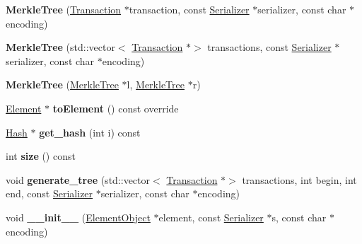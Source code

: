 \begin{DoxyCompactItemize}
\item 
\mbox{\label{classMerkleTree_a257abaf20fa542b29dfdab95294ae578}} 
{\bfseries Merkle\+Tree} (\mbox{\hyperlink{classTransaction}{Transaction}} $\ast$transaction, const \mbox{\hyperlink{classSerializer}{Serializer}} $\ast$serializer, const char $\ast$encoding)
\item 
\mbox{\label{classMerkleTree_abc65d820b1b59f00350b2f4a4bc580bd}} 
{\bfseries Merkle\+Tree} (std\+::vector$<$ \mbox{\hyperlink{classTransaction}{Transaction}} $\ast$$>$ transactions, const \mbox{\hyperlink{classSerializer}{Serializer}} $\ast$serializer, const char $\ast$encoding)
\item 
\mbox{\label{classMerkleTree_a361a5f238249d4893b000560dcabacde}} 
{\bfseries Merkle\+Tree} (\mbox{\hyperlink{classMerkleTree}{Merkle\+Tree}} $\ast$l, \mbox{\hyperlink{classMerkleTree}{Merkle\+Tree}} $\ast$r)
\item 
\mbox{\label{classMerkleTree_a4e72819c6cbc49ed8ce092f464711a5f}} 
\mbox{\hyperlink{classElement}{Element}} $\ast$ {\bfseries to\+Element} () const override
\item 
\mbox{\label{classMerkleTree_a74d741770514ec323521ec6d79d250f2}} 
\mbox{\hyperlink{classHash}{Hash}} $\ast$ {\bfseries get\+\_\+hash} (int i) const
\item 
\mbox{\label{classMerkleTree_aac309360fa4653451af713a8ce9684bd}} 
int {\bfseries size} () const
\item 
\mbox{\label{classMerkleTree_a543fdfd1f1c4ded332cdeae2cd788aac}} 
void {\bfseries generate\+\_\+tree} (std\+::vector$<$ \mbox{\hyperlink{classTransaction}{Transaction}} $\ast$$>$ transactions, int begin, int end, const \mbox{\hyperlink{classSerializer}{Serializer}} $\ast$serializer, const char $\ast$encoding)
\item 
\mbox{\label{classComponent_a28212595f8ee85fe009bd233bc99b2fc}} 
void {\bfseries \+\_\+\+\_\+init\+\_\+\+\_\+} (\mbox{\hyperlink{classElementObject}{Element\+Object}} $\ast$element, const \mbox{\hyperlink{classSerializer}{Serializer}} $\ast$s, const char $\ast$encoding)
\end{DoxyCompactItemize}

